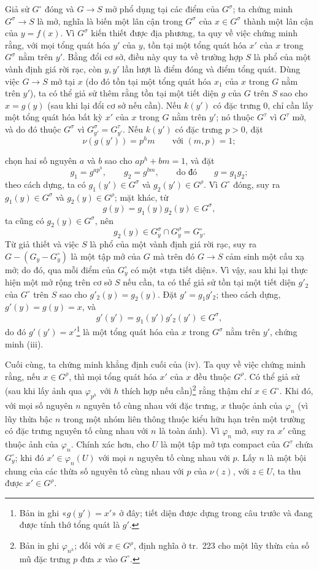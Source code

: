 \documentclass[11pt,twoside,openany]{book}
\numberwithin{equation}{section}
\newcommand{\src}[1]{%
  \phantomsection\hypertarget{src:\fgasourceid:#1}{}%
  \marginpar{\raggedleft\footnotesize\sffamily #1}%
}
\newcommand{\fgasourceid}{unset}
\begin{document}
Giả sử $G^\circ$ đóng và $G\longrightarrow S$ mở phổ dụng tại các điểm của
$G^\sigma$; ta chứng minh $G^\sigma\longrightarrow S$ là mở, nghĩa là biến
một lân cận trong $G^\sigma$ của $x\in G^\sigma$ thành một lân cận của
$y=f(x)$. Vì $G^\sigma$ kiến thiết được địa phương, ta quy về việc chứng minh
rằng, với mọi tổng quát hóa $y'$ của $y$, tồn tại một tổng quát hóa $x'$ của
$x$ trong $G^\sigma$ nằm trên $y'$. Bằng đổi cơ sở, điều này quy ta về trường
hợp $S$ là phổ của một vành định giá rời rạc, còn $y,y'$ lần lượt là điểm đóng
và điểm tổng quát. Dùng việc $G\longrightarrow S$ mở tại $x$ (do đó tồn tại
một tổng quát hóa $x_1$ của $x$ trong $G$ nằm trên $y'$), ta có thể giả sử
thêm rằng tồn tại một tiết diện $g$ của $G$ trên $S$ sao cho $x=g(y)$ (sau
khi lại đổi cơ sở nếu cần). Nếu $k(y')$ có đặc trưng 0, chỉ cần lấy một tổng
quát hóa bất kỳ $x'$ của $x$ trong $G$ nằm trên $y'$; nó thuộc $G^\tau$ vì
$G^\tau$ mở, và do đó thuộc $G^\sigma$ vì
$G_{y'}^\sigma=G_{y'}^\tau$. Nếu $k(y')$ có đặc trưng $p>0$, đặt
\[
\nu(g(y'))=p^hm\qquad\text{với }(m,p)=1 ;
\]
\src{227}
chọn hai số nguyên $a$ và $b$ sao cho $ap^h+bm=1$, và đặt
\[
g_1=g^{ap^h},\qquad g_2=g^{bm},\qquad\text{do đó}\qquad g=g_1g_2 ;
\]
theo cách dựng, ta có $g_1(y')\in G^\sigma$ và
$g_2(y')\in G^\rho$. Vì $G^\circ$ đóng, suy ra
$g_1(y)\in G^\sigma$ và $g_2(y)\in G^\rho$; mặt khác, từ
\[
g(y)=g_1(y)g_2(y)\in G^\sigma,
\]
ta cũng có $g_2(y)\in G^\sigma$, nên
\[
g_2(y)\in G_y^\sigma\cap G_y^\rho=G_y^\circ.
\]
Từ giả thiết và việc $S$ là phổ của một vành định giá rời rạc, suy ra
$G-(G_y-G_y^\circ)$ là một tập mở của $G$ mà trên đó
$G\longrightarrow S$ cảm sinh một cấu xạ mở; do đó, qua mỗi điểm của
$G_y^\circ$ có một «tựa tiết diện». Vì vậy, sau khi lại thực hiện một mở rộng
trên cơ sở $S$ nếu cần, ta có thể giả sử tồn tại một tiết diện $g'_2$ của
$G^\circ$ trên $S$ sao cho $g'_2(y)=g_2(y)$. Đặt $g'=g_1g'_2$; theo cách dựng,
$g'(y)=g(y)=x$, và
\[
g'(y')=g_1(y')g'_2(y')\in G^\sigma,
\]
do đó $g'(y')=x'$\footnote{Bản in ghi «$g(y')=x'$» ở đây; tiết diện được dựng
trong câu trước và đang được tính thớ tổng quát là $g'$.} là một tổng quát hóa
của $x$ trong $G^\sigma$ nằm trên $y'$, chứng minh (iii).

Cuối cùng, ta chứng minh khẳng định cuối của (iv). Ta quy về việc chứng minh
rằng, nếu $x\in G^\rho$, thì mọi tổng quát hóa $x'$ của $x$ đều thuộc
$G^\rho$. Có thể giả sử (sau khi lấy ảnh qua $\varphi_{p^h}$ với $h$ thích
hợp nếu cần)\footnote{Bản in ghi $\varphi_{n^h}$; đối với $x\in G^\rho$, định
nghĩa ở tr.~223 cho một lũy thừa của số mũ đặc trưng $p$ đưa $x$ vào
$G^\circ$.} rằng thậm chí $x\in G^\circ$. Khi đó, với mọi số nguyên $n$
nguyên tố cùng nhau với đặc trưng, $x$ thuộc ảnh của $\varphi_n$ (vì lũy thừa
bậc $n$ trong một nhóm liên thông thuộc kiểu hữu hạn trên một trường có đặc
trưng nguyên tố cùng nhau với $n$ là toàn ánh). Vì $\varphi_n$ mở, suy ra $x'$
cũng thuộc ảnh của $\varphi_n$. Chính xác hơn, cho $U$ là một tập mở tựa
compact của $G^\tau$ chứa $G_y^\circ$; khi đó
$x'\in\varphi_n(U)$ với mọi $n$ nguyên tố cùng nhau với $p$. Lấy $n$ là một
bội chung của các thừa số nguyên tố cùng nhau với $p$ của $\nu(z)$, với
$z\in U$, ta thu được $x'\in G^\rho$.
\end{document}
